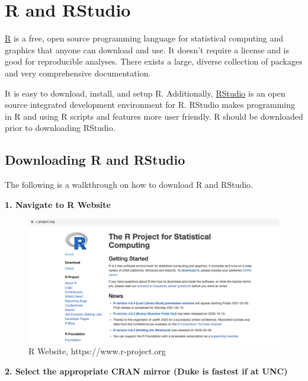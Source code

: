 \documentclass[
]{book}
\begin{document}
\hypertarget{r-and-rstudio}{%
\section{R and RStudio}\label{r-and-rstudio}}

\href{https://www.r-project.org}{R} is a free, open source programming language for statistical computing and graphics that anyone can download and use. It doesn't require a license and is good for reproducible analyses. There exists a large, diverse collection of packages and very comprehensive documentation.

It is easy to download, install, and setup R. Additionally, \href{https://www.rstudio.com}{RStudio} is an open source integrated development environment for R. RStudio makes programming in R and using R scripts and features more user friendly. R should be downloaded prior to downloading RStudio.

\hypertarget{downloading-r-and-rstudio}{%
\subsection{Downloading R and RStudio}\label{downloading-r-and-rstudio}}

The following is a walkthrough on how to download R and RStudio.

\textbf{1. Navigate to R Website}

\begin{figure}
\includegraphics[width=17.71in]{_book/test1_files/figure-html/r_website} \caption{R Website, https://www.r-project.org}\label{fig:website}
\end{figure}

\textbf{2. Select the appropriate CRAN mirror (Duke is fastest if at UNC)}
\end{document}
